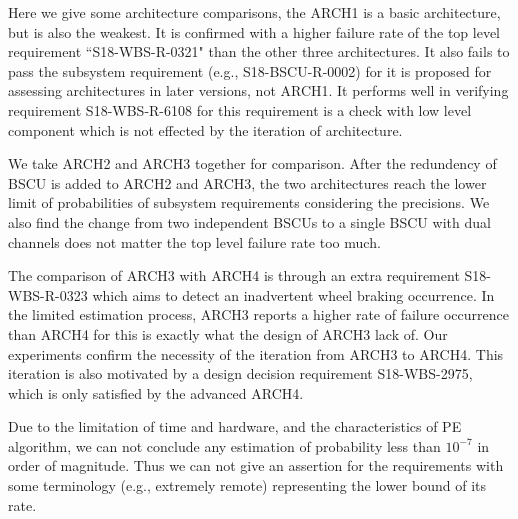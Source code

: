 Here we give some architecture comparisons, the ARCH1 is a basic architecture, but is also the weakest. It is confirmed with a higher failure rate of the top level requirement ``S18-WBS-R-0321" than the other three architectures. It also fails to pass the subsystem requirement (e.g., S18-BSCU-R-0002) for it is proposed for assessing architectures in later versions, not ARCH1. It performs well in verifying requirement S18-WBS-R-6108 for this requirement is a check with low level component which is not effected by the iteration of architecture.

We take ARCH2 and ARCH3 together for comparison. After the redundency of BSCU is added to ARCH2 and ARCH3, the two architectures reach the lower limit of probabilities of subsystem requirements considering the precisions. We also find the change from two independent BSCUs to a single BSCU with dual channels does not matter the top level failure rate too much. 


The comparison of ARCH3 with ARCH4 is through an extra requirement S18-WBS-R-0323 which aims to detect an inadvertent wheel braking occurrence. In the limited estimation process, ARCH3 reports a higher rate of failure occurrence than ARCH4 for this is exactly what the design of ARCH3 lack of. Our experiments confirm the necessity of the iteration from ARCH3 to ARCH4. This iteration is also motivated by a design decision requirement S18-WBS-2975, which is only satisfied by the advanced ARCH4.

Due to the limitation of time and hardware, and the characteristics of PE algorithm, we can not conclude any estimation of probability less than $10^{-7}$ in order of magnitude. Thus we can not give an assertion for the requirements with some terminology (e.g., extremely remote) representing the lower bound of its rate.

